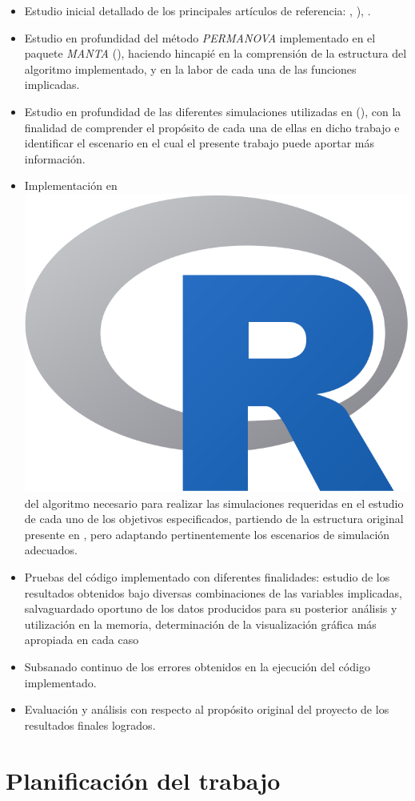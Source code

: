 \documentclass[IB,BIB]{TFUOC}%
\newcommand{\Rlogo}{\protect\includegraphics[height=2.5ex,keepaspectratio]{Rlogo.png}}
\begin{document}
\footnotesize
\begin{itemize}
        \item Estudio inicial detallado de los principales artículos de referencia: \cite{garrido-martin_fast_2022}, \cite{garrido-martin_identification_2021}), \cite{monlong_identification_2014}.
    \item Estudio en profundidad del método \textit{PERMANOVA} implementado en el paquete \textit{MANTA} (\cite{garrido-martin_manta_2023}), haciendo hincapié en la comprensión de la estructura del algoritmo implementado, y en la labor de cada una de las funciones implicadas.
    \item Estudio en profundidad de las diferentes simulaciones utilizadas en \cite{garrido-martin_fast_2022} (\cite{garrido-martin_manta-sim_2022}), con la finalidad de comprender el propósito de cada una de ellas en dicho trabajo e identificar el escenario en el cual el presente trabajo puede aportar más información.
    \item Implementación en \hspace{-.2em}\Rlogo\hspace{+.1em} del algoritmo necesario para realizar las simulaciones requeridas en el estudio de cada uno de los objetivos especificados, partiendo de la estructura original presente en \cite{garrido-martin_manta-sim_2022}, pero adaptando pertinentemente los escenarios de simulación adecuados.
    \item Pruebas del código implementado con diferentes finalidades: estudio de los resultados obtenidos bajo diversas combinaciones de las variables implicadas, salvaguardado oportuno de los datos producidos para su posterior análisis y utilización en la memoria, determinación de la visualización gráfica más apropiada en cada caso 
    \item Subsanado continuo de los errores obtenidos en la ejecución del código implementado.
    \item Evaluación y análisis con respecto al propósito original del proyecto de los resultados finales logrados.
\end{itemize}
\normalsize


\section{Planificación del trabajo}
\label{sec:Planificación del trabajo}

\end{document}

